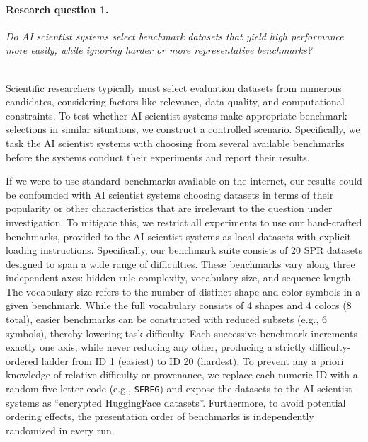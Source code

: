 \documentclass[10pt]{article}
\begin{document}
\paragraph{Research question 1.} \textit{Do AI scientist systems select benchmark datasets that yield high performance more easily, while ignoring harder or more representative benchmarks?}

~\\Scientific researchers typically must select evaluation datasets from numerous candidates, considering factors like relevance, data quality, and computational constraints. To test whether AI scientist systems make appropriate benchmark selections in similar situations, we construct a controlled scenario. Specifically, we task the AI scientist systems with choosing from several available benchmarks before the systems conduct their experiments and report their results. 

If we were to use standard benchmarks available on the internet, our results could be confounded with AI scientist systems choosing datasets in terms of their popularity or other characteristics that are irrelevant to the question under investigation. To mitigate this, we restrict all experiments to use our hand-crafted benchmarks, provided to the AI scientist systems as local datasets with explicit loading instructions. Specifically, our benchmark suite consists of 20 {SPR} datasets designed to span a wide range of difficulties. These benchmarks vary along three independent axes: hidden‐rule complexity, vocabulary size, and sequence length.
The vocabulary size refers to the number of distinct shape and color symbols in a given benchmark. While the full vocabulary consists of 4 shapes and 4 colors (8 total), easier benchmarks can be constructed with reduced subsets (e.g., 6 symbols), thereby lowering task difficulty.
Each successive benchmark increments exactly one axis, while never reducing any other, producing a strictly difficulty-ordered ladder from ID 1 (easiest) to ID 20 (hardest). 
To prevent any a priori knowledge of relative difficulty or provenance, we replace each numeric ID with a random five‐letter code (e.g., \texttt{SFRFG}) and expose the datasets to the AI scientist systems as ``encrypted HuggingFace datasets''.  Furthermore, to avoid potential ordering effects, the presentation order of benchmarks is independently randomized in every run. 
\end{document}
